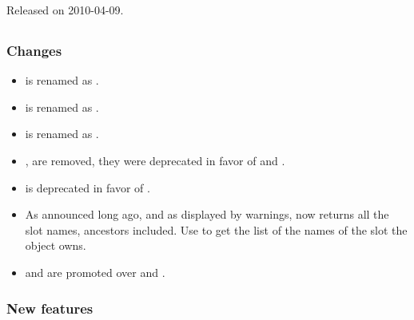 Released on 2010-04-09.

\subsection{\us}

\subsubsection{Changes}

\begin{itemize}
\item {} is renamed as .

\item {} is renamed as .

\item {} is renamed as .

\item {},  are removed, they were
  deprecated in favor of  and .

\item {} is deprecated in favor of
  .

\item As announced long ago, and as displayed by warnings,
   now returns all the slot names, ancestors
  included.  Use  to get the list of the
  names of the slot the object owns.

\item {} and  are
  promoted over  and .
\end{itemize}

\subsubsection{New features}

